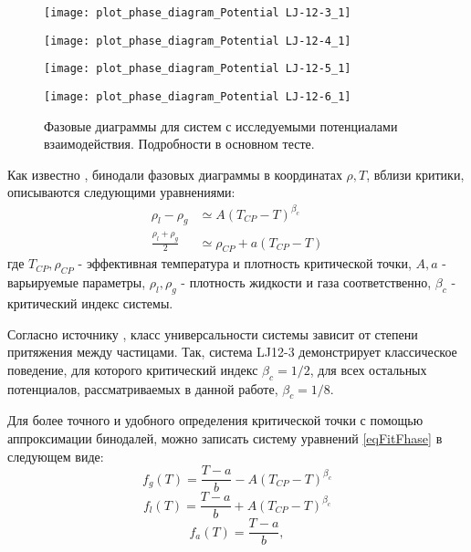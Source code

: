 \begin{figure}[h]
\begin{center}
\begin{minipage}[h]{0.45\linewidth}
\texttt{[image: plot\_phase\_diagram\_Potential LJ-12-3\_1]}
\end{minipage}
\begin{minipage}[h]{0.45\linewidth}
\texttt{[image: plot\_phase\_diagram\_Potential LJ-12-4\_1]}
\end{minipage}

\begin{minipage}[h]{0.45\linewidth}
\texttt{[image: plot\_phase\_diagram\_Potential LJ-12-5\_1]}
\end{minipage}
\begin{minipage}[h]{0.45\linewidth}
\texttt{[image: plot\_phase\_diagram\_Potential LJ-12-6\_1]}
\end{minipage}
\caption{Фазовые диаграммы для систем с исследуемыми потенциалами взаимодействия. Подробности в основном тесте.}
\label{risPhaseDiagrammExp}
\end{center}
\end{figure}

Как известно \cite{fitPhase}, бинодали фазовых диаграммы в координатах $\rho, T$, вблизи критики, описываются следующими уравнениями:
\begin{equation}
\begin{aligned}
\rho_l - \rho_g &\simeq A (T_{CP} - T)^{\beta_c} \\
\frac{\rho_l + \rho_g}{2} &\simeq \rho_{CP} + a(T_{CP} - T)
\end{aligned}
\label{eqFitFhase}
\end{equation}
где $T_{CP}, \rho_{CP}$ - эффективная температура и плотность критической точки, $A, a$ - варьируемые параметры, $\rho_l, \rho_g$ - плотность жидкости и газа соответственно, $\beta_c$ - критический индекс системы.

Согласно источнику \cite{classCrit}, класс универсальности системы зависит от степени притяжения между частицами. Так, система LJ12-3 демонстрирует классическое поведение, для которого критический индекс $\beta_c = 1/2$, для всех остальных потенциалов, рассматриваемых в данной работе, $\beta_c = 1/8$.

Для более точного и удобного определения критической точки с помощью аппроксимации бинодалей, можно записать систему уравнений \ref{eqFitFhase} в следующем виде:
\begin{equation}
f_g(T) = \frac{T-a}{b} - A(T_{CP} - T)^{\beta_c}
\label{eqFitFhaseGas}
\end{equation}
\begin{equation}
f_l(T) = \frac{T-a}{b} + A(T_{CP} - T)^{\beta_c}
\label{eqFitFhaseLicuid}
\end{equation}
\begin{equation}
f_a(T) = \frac{T-a}{b},
\label{eqFitFhaseAverage}
\end{equation}

